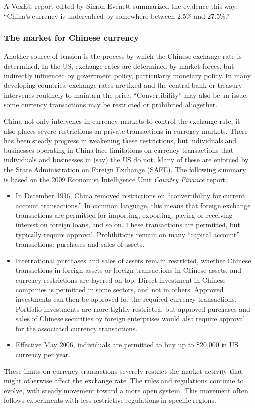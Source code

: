\documentclass[letterpaper,12pt]{article}
\begin{document}
A VoxEU report edited by Simon Evenett 
summarized the evidence this way:  
``China's currency is undervalued by somewhere between 2.5\% and 27.5\%.''


\subsubsection*{The market for Chinese currency}

Another source of tension is the process by which the 
Chinese exchange rate is determined.
In the US, exchange rates are determined by market forces, 
but indirectly influenced by government policy, particularly
monetary policy.
In many developing countries, 
exchange rates are fixed and the central bank or treasury
intervenes routinely to maintain the price.  
``Convertibility'' may also be an issue:  
some currency transactions 
may be restricted or prohibited altogether.  


China not only intervenes in currency markets to control the 
exchange rate, 
it also places severe restrictions
on private transactions in currency markets.  
There has been steady progress in weakening these restrictions, 
but individuals and businesses operating in China face 
limitations on currency transactions that 
individuals and businesses in (say) the US do not.  
Many of these are enforced by the State Administration on 
Foreign Exchange (SAFE).  
The following summary is based on the 2009 Economist Intelligence Unit
{\it Country Finance\/} report.
%
\begin{itemize}
\item In December 1996, China removed restrictions on 
``convertibility for current account transactions.''
In common language, this means that foreign exchange transactions 
are permitted for importing, exporting, paying or receiving interest
on foreign loans, and so on.  
These transactions are permitted, but typically require approval.  
Prohibitions remain on many ``capital account'' transactions:  
purchases and sales of assets.  

\item International purchases and sales of assets remain restricted, 
whether Chinese transactions in foreign assets or 
foreign transactions in Chinese assets, 
and currency restrictions are layered on top.  
Direct investment in Chinese companies is permitted in some
sectors, and not in others.  
Approved investments can then be approved for the required currency
transactions.  
Portfolio investments are more tightly restricted, 
but approved purchases and sales of Chinese securities 
by foreign enterprises would also require approval for
the associated currency transactions.  

\item Effective May 2006, 
individuals are permitted to buy up to \$20,000 in US currency per year.  
\end{itemize}
%
These limits on currency transactions severely restrict the market activity
that might otherwise affect the exchange rate. 
The rules and regulations continue to evolve, 
with steady movement toward a more open system.  
This movement often follows experiments with less restrictive 
regulations in specific regions.
\end{document}

